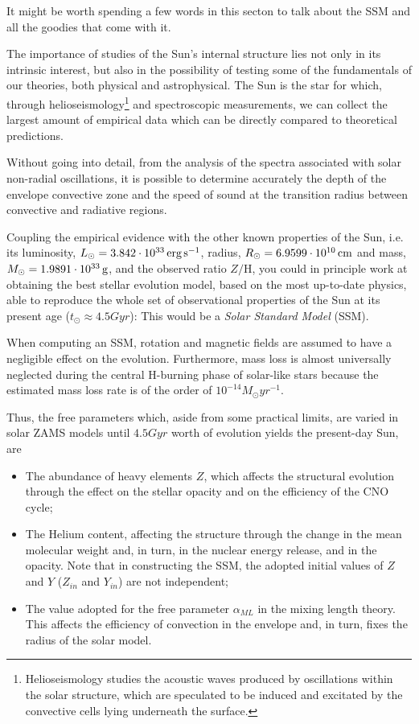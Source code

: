 \par It might be worth spending a few words in this secton to talk about the SSM and all the goodies that come with it.
\par The importance of studies of the Sun’s internal structure lies not only in its intrinsic interest, but also in the possibility of testing some of the fundamentals of our theories, both physical and astrophysical. The Sun is the star for which, through helioseismology\footnote{Helioseismology studies the acoustic waves produced by oscillations within the solar structure, which are speculated to be induced and excitated by the convective cells lying underneath the surface.} and spectroscopic measurements, we can collect the largest amount of empirical data which can be directly compared to theoretical predictions.
\par Without going into detail, from the analysis of the spectra associated with solar non-radial oscillations, it is possible to determine accurately the depth of the envelope convective zone and the speed of sound at the transition radius between convective and radiative regions.
\par Coupling the empirical evidence with the other known properties of the Sun, i.e. its luminosity, $L_{\odot}=3.842\cdot 10^{33}\,\text{erg}\,\text{s}^{-1}$, radius, $R_{\odot} = 6.9599\cdot 10^{10}\,\text{cm}$ and mass, $M_{\odot} = 1.9891\cdot 10^{33}\,\text{g}$, and the observed ratio $Z/\text{H}$, you could in principle work at obtaining the best stellar evolution model, based on the most up-to-date physics, able to reproduce the whole set of observational properties of the Sun at its present age ($t_{\odot} \approx 4.5\unit{Gyr}$): This would be a \emph{Solar Standard Model} (SSM).
\par When computing an SSM, rotation and magnetic fields are assumed to have a negligible effect on the evolution. Furthermore, mass loss is almost universally neglected during the central H-burning phase of solar-like stars because the estimated mass loss rate is of the order of $10^{-14}M_{\odot}\unit{yr}^{-1}$.
\par Thus, the free parameters which, aside from some practical limits, are varied in solar ZAMS models until $4.5\unit{Gyr}$ worth of evolution yields the present-day Sun, are
\begin{itemize}
    \item The abundance of heavy elements $Z$, which affects the structural evolution through the effect on the stellar opacity and on the efficiency of the CNO cycle;
    \item The Helium content, affecting the structure through the change in the mean molecular weight and, in turn, in the nuclear energy release, and in the opacity. Note that in constructing the SSM, the adopted initial values of $Z$ and $Y$ ($Z_{in}$ and $Y_{in}$) are not independent;
    \item The value adopted for the free parameter $\alpha_{ML}$ in the mixing length theory. This affects the efficiency of convection in the envelope and, in turn, fixes the radius of the solar model.
\end{itemize}
